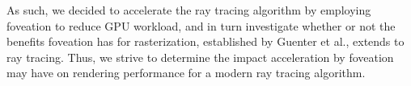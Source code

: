 As such, we decided to accelerate the ray tracing algorithm by employing foveation to reduce GPU workload, and in turn investigate whether or not the benefits foveation has for rasterization, established by Guenter et al., extends to ray tracing.
Thus, we strive to determine the impact acceleration by foveation may have on rendering performance for a modern ray tracing algorithm.

